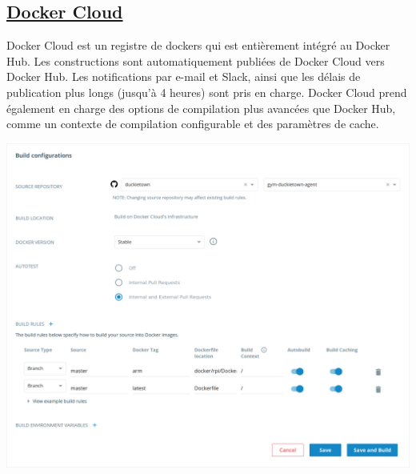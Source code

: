 \subsection{\href{https://cloud.docker.com/}{Docker Cloud}}

Docker Cloud est un registre de dockers qui est entièrement intégré au Docker Hub. Les constructions sont automatiquement publiées de Docker Cloud vers Docker Hub. Les notifications par e-mail et Slack, ainsi que les délais de publication plus longs (jusqu'à 4 heures) sont pris en charge. Docker Cloud prend également en charge des options de compilation plus avancées que Docker Hub, comme un contexte de compilation configurable et des paramètres de cache.

\begin{centering}
\includegraphics[width=\textwidth]{../figures/docker_cloud.png}
\end{centering}
